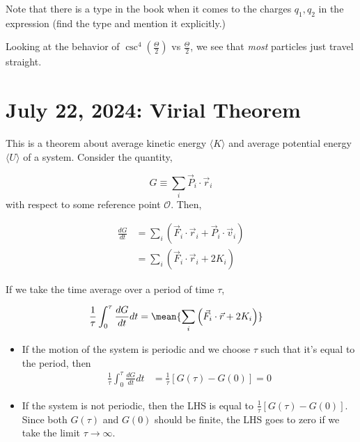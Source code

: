 \documentclass[11pt]{article}
\begin{document}
\begin{redbox}
  Note that there is a type in the book when it comes to the charges $q_1, q_2$ in the expression (find the type and mention it explicitly.)
\end{redbox}

\vskip 0.5cm
Looking at the behavior of $\csc^4 \left(\frac{\Theta}{2}\right)$ vs $\frac{\Theta}{2}$, we see that \emph{most} particles just travel straight.


\pagebreak
\section{July 22, 2024: Virial Theorem}

This is a theorem about average kinetic energy $\langle K \rangle$ and average potential energy $\langle U \rangle$ of a system. Consider the quantity,

\[ G \equiv \sum_{i} \vec{P}_i \cdot \vec{r}_i \]
with respect to some reference point $\mathcal{O}$. Then,

\begin{align*}
  \frac{dG}{dt} &= \sum_i \left( \vec{F}_i \cdot \vec{r}_i + \vec{P}_i \cdot \vec{v}_i \right) \\
  &= \sum_i \left( \vec{F}_i \cdot \vec{r}_i + 2 K_i \right)
\end{align*}

If we take the time average over a period of time $\tau$, 

\begin{align*}
  \frac{1}{\tau} \int_{0}^{\tau} \frac{dG}{dt} dt &= \mean{ \sum_i \left( \vec{F}_i \cdot \vec{r} + 2 K_i \right) }
\end{align*}

\begin{itemize}
  \item If the motion of the system is periodic and we choose $\tau$ such that it's equal to the period, then 
  \begin{align*}
    \frac{1}{\tau} \int_{0}^{\tau} \frac{dG}{dt} dt &= \frac{1}{\tau} \left[ G(\tau) - G(0) \right] = 0
  \end{align*}

  \vskip 0.5cm
  \item If the system is not periodic, then the LHS is equal to 
  $\frac{1}{\tau} \left[G(\tau) - G(0)\right]$. Since both $G(\tau)$ and $G(0)$ should be finite, the LHS goes to zero if we take the limit $\tau \rightarrow \infty$.
\end{itemize}
\end{document}
